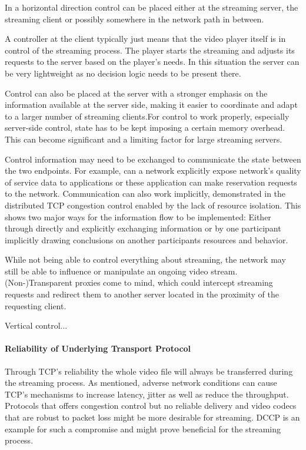 In a horizontal direction control can be placed either at the streaming server, the streaming client or possibly somewhere in the network path in between.

A controller at the client typically just means that the video player itself is in control of the streaming process. The player starts the streaming and adjusts its requests to the server based on the player's needs. In this situation the server can be very lightweight as no decision logic needs to be present there.

Control can also be placed at the server with a stronger emphasis on the information available at the server side, making it easier to coordinate and adapt to a larger number of streaming clients.For control to work properly, especially server-side control, state has to be kept imposing a
certain memory overhead. This can become significant and a limiting factor for large streaming servers.

Control information may need to be exchanged to communicate the state between the two endpoints. 
 For example, can a network explicitly expose network's quality of service data to applications or these application can make reservation requests to the network. Communication can also work implicitly, demonstrated in the distributed \gls{TCP} congestion control enabled by the lack of resource isolation. This shows two major ways for the information flow to be implemented: Either through directly and explicitly exchanging information or by one participant implicitly drawing conclusions on another participants resources and behavior.

While not being able to control everything about streaming, the network may still be able to influence or manipulate an ongoing video stream. (Non-)Transparent proxies come to mind, which could intercept streaming requests and redirect them to another server located in the proximity of the requesting client.

Vertical control...

\paragraph{Reliability of Underlying Transport Protocol} %

Through TCP's reliability the whole video file will always be transferred during the streaming process. As mentioned, adverse network conditions can cause \gls{TCP}'s mechanisms to increase latency, jitter as well as reduce the throughput. Protocols that offers congestion control but no reliable delivery and video codecs that are robust to packet loss might be more desirable for streaming. \gls{DCCP} \cite{kohler2006designing} is an example for such a compromise and might prove beneficial for the streaming process.

